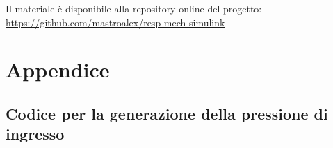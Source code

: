 Il materiale è disponibile alla repository online del progetto: \url{https://github.com/mastroalex/resp-mech-simulink}


\raggedbottom
\printbibliography[title=Riferimenti]


\clearpage
\onecolumn
\section*{Appendice}
\subsection*{Codice per la generazione della pressione di ingresso}
